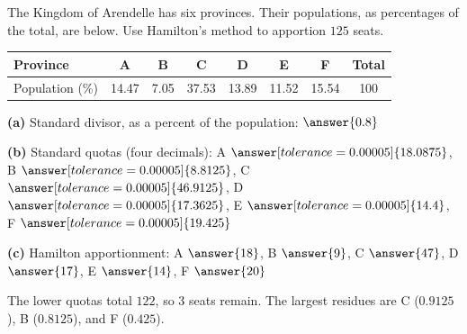 \documentclass[12pt]{ximera}
\begin{document}
\begin{problem}
The Kingdom of Arendelle has six provinces. Their populations, as percentages of the
total, are below. Use Hamilton's method to apportion $125$ seats.
\begin{center}
\begin{tabular}{l|ccccccc}
Province & A & B & C & D & E & F & Total\\\hline
Population (\%) & 14.47 & 7.05 & 37.53 & 13.89 & 11.52 & 15.54 & 100
\end{tabular}
\end{center}

\begin{prompt}
\textbf{(a)} Standard divisor, as a percent of the population: $\answer{0.8}$
\end{prompt}

\begin{prompt}
\textbf{(b)} Standard quotas (four decimals):
A $\answer[tolerance=0.00005]{18.0875}$, B $\answer[tolerance=0.00005]{8.8125}$,
C $\answer[tolerance=0.00005]{46.9125}$, D $\answer[tolerance=0.00005]{17.3625}$,
E $\answer[tolerance=0.00005]{14.4}$, F $\answer[tolerance=0.00005]{19.425}$
\end{prompt}

\begin{prompt}
\textbf{(c)} Hamilton apportionment: A $\answer{18}$, B $\answer{9}$, C $\answer{47}$,
D $\answer{17}$, E $\answer{14}$, F $\answer{20}$
\begin{feedback}
The lower quotas total $122$, so $3$ seats remain. The largest residues are C
($0.9125$), B ($0.8125$), and F ($0.425$).
\end{feedback}
\end{prompt}
\end{problem}
\end{document}

